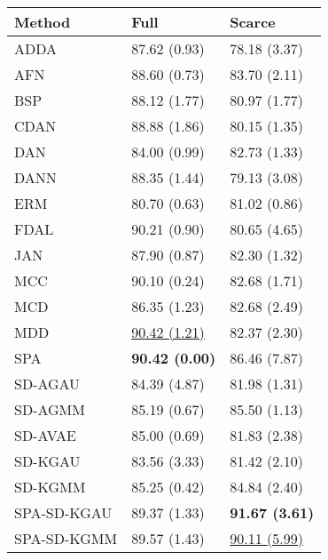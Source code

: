 \begin{tabular}{lll}
\toprule
Method & Full & Scarce \\
\midrule
ADDA & 87.62 (0.93) & 78.18 (3.37) \\
AFN & 88.60 (0.73) & 83.70 (2.11) \\
BSP & 88.12 (1.77) & 80.97 (1.77) \\
CDAN & 88.88 (1.86) & 80.15 (1.35) \\
DAN & 84.00 (0.99) & 82.73 (1.33) \\
DANN & 88.35 (1.44) & 79.13 (3.08) \\
ERM & 80.70 (0.63) & 81.02 (0.86) \\
FDAL & 90.21 (0.90) & 80.65 (4.65) \\
JAN & 87.90 (0.87) & 82.30 (1.32) \\
MCC & 90.10 (0.24) & 82.68 (1.71) \\
MCD & 86.35 (1.23) & 82.68 (2.49) \\
MDD & \underline{90.42 (1.21)} & 82.37 (2.30) \\
SPA & \textbf{90.42 (0.00)} & 86.46 (7.87) \\
\midrule
SD-AGAU & 84.39 (4.87) & 81.98 (1.31) \\
SD-AGMM & 85.19 (0.67) & 85.50 (1.13) \\
SD-AVAE & 85.00 (0.69) & 81.83 (2.38) \\
SD-KGAU & 83.56 (3.33) & 81.42 (2.10) \\
SD-KGMM & 85.25 (0.42) & 84.84 (2.40) \\
SPA-SD-KGAU & 89.37 (1.33) & \textbf{91.67 (3.61)} \\
SPA-SD-KGMM & 89.57 (1.43) & \underline{90.11 (5.99)} \\
\bottomrule
\end{tabular}